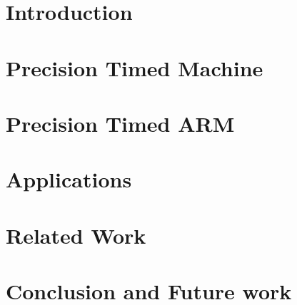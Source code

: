 \documentclass[11pt]{ucthesis}
\begin{document}
\chapter{Introduction}
\label{chapter:intro}


\chapter{Precision Timed Machine}
\label{chapter:pret}


\chapter{Precision Timed ARM}
\label{chapter:ptarm}


\chapter{Applications}
\label{chapter:app}



\chapter{Related Work}
\label{chapter:related}


\chapter{Conclusion and Future work}
\label{chapter:summary}


%


  

\end{document}

